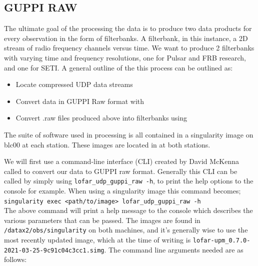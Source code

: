 \documentclass[12pt, onepage]{article}
\numberwithin{equation}{section} %
\begin{document}
\subsection{GUPPI RAW}
The ultimate goal of the processing the data is to produce two data products for every observation in the form of filterbanks. A filterbank, in this instance, a 2D stream of radio frequency channels versus time. We want to produce 2 filterbanks with varying time and frequency resolutions, one for Pulsar and FRB research, and one for SETI. A general outline of the this process can be outlined as:
\begin{itemize}
    \item Locate compressed UDP data streams
    \item Convert data in GUPPI Raw format with 
    \item Convert .raw files produced above into filterbanks using 
\end{itemize}

The suite of software used in processing is all contained in a singularity image on blc00 at each station. These images are located in  at both stations. 

We will first use a command-line interface (CLI) created by David McKenna called  to convert our data to GUPPI raw format. Generally this CLI can be called by simply using \texttt{lofar\_udp\_guppi\_raw -h}, to print the help options to the console for example. When using a singularity image this command becomes;\\
\texttt{singularity exec <path/to/image> lofar\_udp\_guppi\_raw -h}\\
The above command will print a help message to the console which describes the various parameters that can be passed. The images are found in \texttt{/datax2/obs/singularity} on both machines, and it's generally wise to use the most recently updated image, which at the time of writing is  \texttt{lofar-upm\_0.7.0-2021-03-25-9c91c04c3cc1.simg}. The command line arguments needed are as follows:
\end{document}

